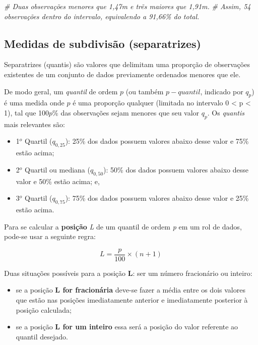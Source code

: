 \documentclass[
]{book}
\newenvironment{Shaded}{\begin{snugshade}}{\end{snugshade}}
\newcommand{\CommentTok}[1]{\textcolor[rgb]{0.56,0.35,0.01}{\textit{#1}}}
\providecommand{\tightlist}{%
  \setlength{\itemsep}{0pt}\setlength{\parskip}{0pt}}
\begin{document}
\begin{Shaded}
\begin{Highlighting}[]
\CommentTok{\# Duas observações menores que 1,47m e trẽs maiores que 1,91m.}
\CommentTok{\# Assim, 54 observações dentro do intervalo, equivalendo a 91,66\% do total.}
\end{Highlighting}
\end{Shaded}

\hypertarget{medidas-de-subdivisuxe3o-separatrizes}{%
\subsection{Medidas de subdivisão (separatrizes)}\label{medidas-de-subdivisuxe3o-separatrizes}}

Separatrizes (quantis) são valores que delimitam uma proporção de observações existentes de um conjunto de dados previamente ordenados menores que ele.

De modo geral, um \emph{quantil} de ordem \(p\) (ou também \(p-quantil\), indicado por \(q_{p}\)) é uma medida onde \(p\) é uma proporção qualquer (limitada no intervalo 0 \textless{} p \textless{} 1), tal que 100\(p\)\% das observações sejam menores que seu valor \(q_{p}\). Os \emph{quantis} mais relevantes são:

\begin{itemize}
\tightlist
\item
  1\(^{o}\) Quartil (\(q_{0,25}\)): 25\% dos dados possuem valores abaixo desse valor e 75\% estão acima;
\item
  2\(^{o}\) Quartil ou mediana (\(q_{0,50}\)): 50\% dos dados possuem valores abaixo desse valor e 50\% estão acima; e,
\item
  3\(^{o}\) Quartil (\(q_{0,75}\)): 75\% dos dados possuem valores abaixo desse valor e 25\% estão acima.
\end{itemize}

Para se calcular a \textbf{posição} \emph{L} de um quantil de ordem \emph{p} em um rol de dados, pode-se usar a seguinte regra:

\[
L=\frac{p}{100} \times (n+1)
\]

Duas situações possíveis para a posição \textbf{L}: ser um número fracionário ou inteiro:

\begin{itemize}
\tightlist
\item
  se a posição \textbf{L for fracionária} deve-se fazer a média entre os dois valores que estão nas posições imediatamente anterior e imediatamente posterior à posição calculada;
\item
  se a posição \textbf{L for um inteiro} essa será a posição do valor referente ao quantil desejado.
\end{itemize}
\end{document}
